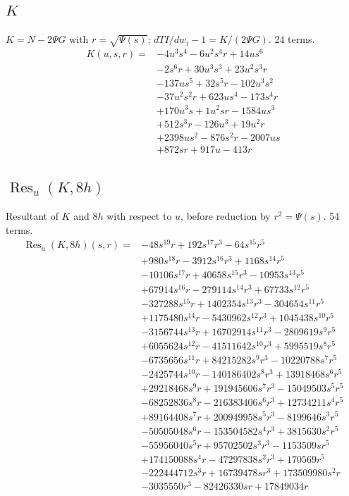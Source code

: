 \subsection*{$K$}
$K=N-2\Psi G$ with $r=\sqrt{\Psi(s)}$; $dTI/dw_i-1=K/(2\Psi G)$. 24 terms.
{\small
\begin{align*}
K(u,s,r)={}&-4u^{3}s^{4}-6u^{2}s^{4}r+14us^{6}\\
&-2s^{6}r+30u^{3}s^{3}+23u^{2}s^{3}r\\
&-137us^{5}+32s^{5}r-102u^{3}s^{2}\\
&-37u^{2}s^{2}r+623us^{4}-173s^{4}r\\
&+170u^{3}s+1u^{2}sr-1584us^{3}\\
&+512s^{3}r-126u^{3}+19u^{2}r\\
&+2398us^{2}-876s^{2}r-2007us\\
&+872sr+917u-413r
\end{align*}
}

\subsection*{$\operatorname{Res}_u(K,8h)$}
Resultant of $K$ and $8h$ with respect to $u$, before reduction by $r^2=\Psi(s)$. 54 terms.
{\small
\begin{align*}
\operatorname{Res}_u(K,8h)(s,r)={}&-48s^{19}r+192s^{17}r^{3}-64s^{15}r^{5}\\
&+980s^{18}r-3912s^{16}r^{3}+1168s^{14}r^{5}\\
&-10106s^{17}r+40658s^{15}r^{3}-10953s^{13}r^{5}\\
&+67914s^{16}r-279114s^{14}r^{3}+67733s^{12}r^{5}\\
&-327288s^{15}r+1402354s^{13}r^{3}-304654s^{11}r^{5}\\
&+1175480s^{14}r-5430962s^{12}r^{3}+1045438s^{10}r^{5}\\
&-3156744s^{13}r+16702914s^{11}r^{3}-2809619s^{9}r^{5}\\
&+6055624s^{12}r-41511642s^{10}r^{3}+5995519s^{8}r^{5}\\
&-6735656s^{11}r+84215282s^{9}r^{3}-10220788s^{7}r^{5}\\
&-2425744s^{10}r-140186402s^{8}r^{3}+13918468s^{6}r^{5}\\
&+29218468s^{9}r+191945606s^{7}r^{3}-15049503s^{5}r^{5}\\
&-68252836s^{8}r-216383406s^{6}r^{3}+12734211s^{4}r^{5}\\
&+89164408s^{7}r+200949958s^{5}r^{3}-8199646s^{3}r^{5}\\
&-50505048s^{6}r-153504582s^{4}r^{3}+3815630s^{2}r^{5}\\
&-55956040s^{5}r+95702502s^{3}r^{3}-1153509sr^{5}\\
&+174150088s^{4}r-47297838s^{2}r^{3}+170569r^{5}\\
&-222444712s^{3}r+16739478sr^{3}+173509980s^{2}r\\
&-3035550r^{3}-82426330sr+17849034r
\end{align*}
}

